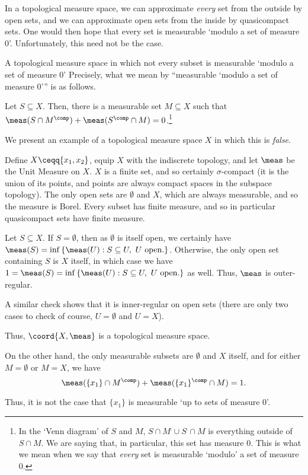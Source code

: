 In a topological measure space, we can approximate \emph{every} set from the outside by open sets, and we can approximate open sets from the inside by quasicompact sets.  One would then hope that every set is measurable `modulo a set of measure $0$'.  Unfortunately, this need not be the case.
\begin{exm}{A topological measure space in which not every subset is measurable `modulo a set of measure $0$'}{}
Precisely, what we mean by ``measurable `modulo a set of measure $0$''' is as follows.
\begin{important}
Let $S\subseteq X$.  Then, there is a measurable set $M\subseteq X$ such that $\meas (S\cap M^{\comp})+\meas (S^{\comp}\cap M)=0$.\footnote{In the `Venn diagram' of $S$ and $M$, $S\cap M^{\comp}\cup S^{\comp}\cap M$ is everything outside of $S\cap M$.  We are saying that, in particular, this set has measure $0$.  This is what we mean when we say that \emph{every} set is measurable `modulo' a set of measure $0$.}
\end{important}
We present an example of a topological measure space $X$ in which this is \emph{false}.

Define $X\ceqq \{ x_1,x_2\}$, equip $X$ with the indiscrete topology, and let $\meas$ be the Unit Measure on $X$.  $X$ is a finite set, and so certainly $\sigma$-compact (it is the union of its points, and points are always compact spaces in the subspace topology).  The only open sets are $\emptyset$ and $X$, which are always measurable, and so the measure is Borel.  Every subset has finite measure, and so in particular quasicompact sets have finite measure.

Let $S\subseteq X$.  If $S=\emptyset$, then as $\emptyset$ is itself open, we certainly have $\meas (S)=\inf \left\{ \meas (U):S\subseteq U,\ U\text{ open.}\right\}$.  Otherwise, the only open set containing $S$ is $X$ itself, in which case we have $1=\meas (S)=\inf \left\{ \meas (U):S\subseteq U,\ U\text{ open.}\right\}$ as well.  Thus, $\meas$ is outer-regular.

A similar check shows that it is inner-regular on open sets (there are only two cases to check of course, $U=\emptyset$ and $U=X$).

Thus, $\coord{X,\meas}$ is a topological measure space.

On the other hand, the only measurable subsets are $\emptyset$ and $X$ itself, and for either $M=\emptyset$ or $M=X$, we have
\begin{equation}
\meas (\{ x_1\} \cap M^{\comp})+\meas (\{ x_1\} ^{\comp}\cap M)=1.
\end{equation}

Thus, it is not the case that $\{ x_1\}$ is measurable `up to sets of measure $0$'.
\end{exm}

